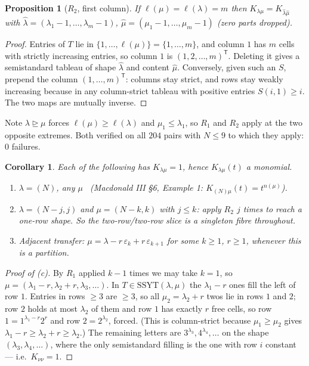 \documentclass[11pt]{article}
\theoremstyle{plain}
\newtheorem{proposition}[theorem]{Proposition}
\newtheorem{corollary}[theorem]{Corollary}
\theoremstyle{definition}
\newcommand{\SSYT}{\mathrm{SSYT}}
\DeclareMathOperator{\dom}{\trianglerighteq}
\begin{document}
\begin{proposition}[$R_2$, first column]\label{prop:R2}
If $\ell(\mu)=\ell(\lambda)=m$ then $K_{\lambda\mu}=K_{\hat\lambda\hat\mu}$ with
$\hat\lambda=(\lambda_1-1,\dots,\lambda_m-1)$, $\hat\mu=(\mu_1-1,\dots,\mu_m-1)$
(zero parts dropped).
\end{proposition}
\begin{proof}
Entries of $T$ lie in $\{1,\dots,\ell(\mu)\}=\{1,\dots,m\}$, and column $1$ has $m$ cells
with strictly increasing entries, so column $1$ is $(1,2,\dots,m)^{\mathsf T}$.  Deleting
it gives a semistandard tableau of shape $\hat\lambda$ and content $\hat\mu$.
Conversely, given such an $S$, prepend the column $(1,\dots,m)^{\mathsf T}$: columns stay
strict, and rows stay weakly increasing because in any column-strict tableau with
positive entries $S(i,1)\ge i$.  The two maps are mutually inverse.
\end{proof}

Note $\lambda\dom\mu$ forces $\ell(\mu)\ge\ell(\lambda)$ and $\mu_1\le\lambda_1$, so
$R_1$ and $R_2$ apply at the two opposite extremes.  Both verified on all $204$ pairs
with $N\le9$ to which they apply: $0$ failures.

\begin{corollary}\label{cor:families}
Each of the following has $K_{\lambda\mu}=1$, hence $K_{\lambda\mu}(t)$ a monomial.
\begin{enumerate}
\item[(a)] $\lambda=(N)$, any $\mu$ \ (Macdonald III \S6, Example 1: $K_{(N)\mu}(t)=t^{n(\mu)}$).
\item[(b)] $\lambda=(N-j,j)$ and $\mu=(N-k,k)$ with $j\le k$: apply $R_2$ $j$ times to
reach a one-row shape.  So the two-row/two-row slice is a singleton fibre throughout.
\item[(c)] \emph{Adjacent transfer}: $\mu=\lambda-r\,\varepsilon_k+r\,\varepsilon_{k+1}$
for some $k\ge1$, $r\ge1$, whenever this is a partition.
\end{enumerate}
\end{corollary}
\begin{proof}[Proof of (c)]
By $R_1$ applied $k-1$ times we may take $k=1$, so
$\mu=(\lambda_1-r,\lambda_2+r,\lambda_3,\dots)$.  In $T\in\SSYT(\lambda,\mu)$ the
$\lambda_1-r$ ones fill the left of row $1$.  Entries in rows $\ge3$ are $\ge3$, so all
$\mu_2=\lambda_2+r$ twos lie in rows $1$ and $2$; row $2$ holds at most $\lambda_2$ of
them and row $1$ has exactly $r$ free cells, so row $1=1^{\lambda_1-r}2^{r}$ and row
$2=2^{\lambda_2}$, forced.  (This is column-strict because $\mu_1\ge\mu_2$ gives
$\lambda_1-r\ge\lambda_2+r\ge\lambda_2$.)  The remaining letters are
$3^{\lambda_3},4^{\lambda_4},\dots$ on the shape $(\lambda_3,\lambda_4,\dots)$, where the
only semistandard filling is the one with row $i$ constant --- i.e.\ $K_{\nu\nu}=1$.
\end{proof}
\end{document}
